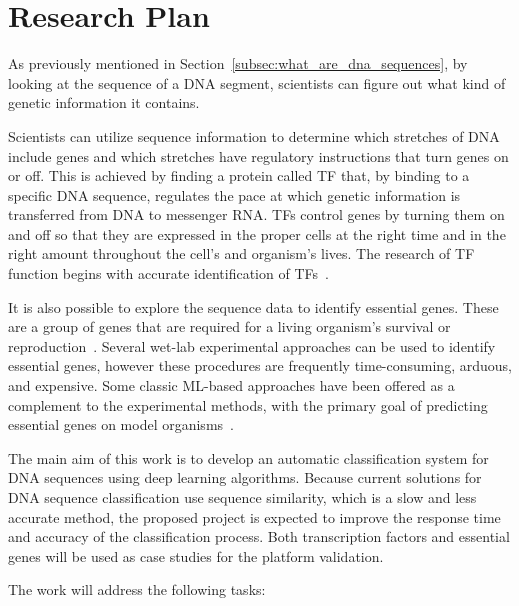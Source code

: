 \chapter{Research Plan}
\label{cha:research_plan}

As previously mentioned in Section~\ref{subsec:what_are_dna_sequences}, by looking at the sequence of a DNA segment, scientists can figure out what kind of genetic information it contains. 

Scientists can utilize sequence information to determine which stretches of DNA include genes and which stretches have regulatory instructions that turn genes on or off. This is achieved by finding a protein called \gls{TF} that, by binding to a specific \gls{DNA} sequence, regulates the pace at which genetic information is transferred from DNA to messenger RNA. \gls{TF}s control genes by turning them on and off so that they are expressed in the proper cells at the right time and in the right amount throughout the cell's and organism's lives. The research of \gls{TF} function begins with accurate identification of \gls{TF}s~\cite{Hu2019AnimalTFDBFactors}.

It is also possible to explore the sequence data to identify essential genes. These are a group of genes that are required for a living organism's survival or reproduction~\cite{Zhang2020DeepHE:Learning}. Several wet-lab experimental approaches can be used to identify essential genes, however these procedures are frequently time-consuming, arduous, and expensive. Some classic \gls{ML}-based approaches have been offered as a complement to the experimental methods, with the primary goal of predicting essential genes on model organisms~\cite{Zhang2020DeepHE:Learning}.

The main aim of this work is to develop an automatic classification system for DNA sequences using deep learning algorithms. Because current solutions for DNA sequence classification use sequence similarity, which is a slow and less accurate method, the proposed project is expected to improve the response time and accuracy of the classification process. Both transcription factors and essential genes will be used as case studies for the platform validation.

The work will address the following tasks:


